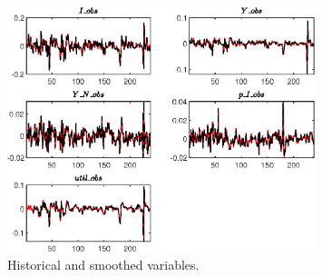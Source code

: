  
\begin{figure}[H]
\centering 
\includegraphics[width=0.80\textwidth]{BRS_growth_util/graphs/BRS_growth_util_HistoricalAndSmoothedVariables1}
\caption{Historical and smoothed variables.}\label{Fig:HistoricalAndSmoothedVariables:1}
\end{figure}


